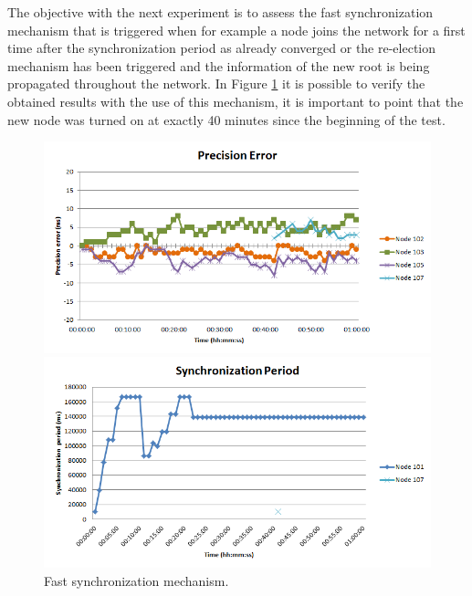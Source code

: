\documentclass[11pt,a4]{article}
\begin{document}
\begin{multicols}{2}
The objective with the next experiment is to assess the fast synchronization mechanism that is triggered when for example a node joins the network for a first time after the synchronization period as already converged or the re-election mechanism has been triggered and the information of the new root is being propagated throughout the network. In Figure \ref{fastsync} it is possible to verify the obtained results with the use of this mechanism, it is important to point that the new node was turned on at exactly 40 minutes since the beginning of the test.

\begin{figure}[!b]
\begin{minipage}[b]{0.5\linewidth}
\includegraphics[scale=0.3]{./images/15-ttsp-10ms6nodes-fastsync-error.png}
\end{minipage}
\hspace{0.5cm}
\begin{minipage}[b]{0.5\linewidth}
\includegraphics[scale=0.3]{./images/16-ttsp-10ms6nodes-fastsync-period.png}
\end{minipage}
\caption{Fast synchronization mechanism.}
\label{fastsync}
\end{figure}


\end{multicols}
\end{document}
